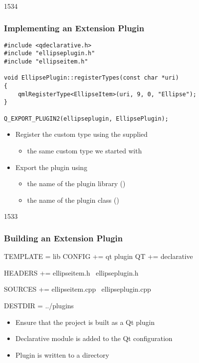 \begin{slide}[fragile]{1534}\frametitle{Implementing an Extension Plugin}

\begin{lstlisting}
#include <qdeclarative.h>
#include "ellipseplugin.h"
#include "ellipseitem.h"

void EllipsePlugin::registerTypes(const char *uri)
{
    qmlRegisterType<EllipseItem>(uri, 9, 0, "Ellipse");
}

Q_EXPORT_PLUGIN2(ellipseplugin, EllipsePlugin);
\end{lstlisting}

\vspace*{0.5em}
\begin{itemize}
\item Register the custom type using the  supplied
  \begin{itemize}
  \item the same custom type we started with
  \end{itemize}
\item Export the plugin using
  \begin{itemize}
  \item the name of the plugin library ()
  \item the name of the plugin class ()
  \end{itemize}
\end{itemize}

\end{slide}

\begin{slide}[fragile]{1533}\frametitle{Building an Extension Plugin}

\begin{qmake}
TEMPLATE  = lib
CONFIG   += qt plugin
QT       += declarative

HEADERS  += ellipseitem.h \
            ellipseplugin.h

SOURCES  += ellipseitem.cpp \
            ellipseplugin.cpp

DESTDIR   = ../plugins
\end{qmake}

\vspace*{0.5em}
\begin{itemize}
\item Ensure that the project is built as a Qt plugin
\item Declarative module is added to the Qt configuration
\item Plugin is written to a \qtt{plugins} directory
\end{itemize}

\end{slide}


